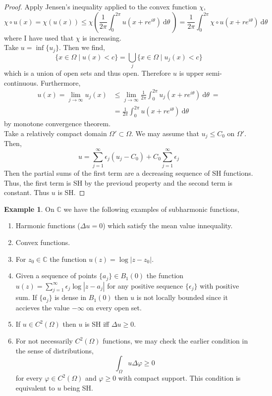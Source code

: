 \documentclass[12pt]{extarticle}
\newcommand{\C}{\mathbb{C}}
\renewcommand{\d}[1]{\: \mathrm{d}#1 \:}
\theoremstyle{definition}
\newtheorem{example}[theorem]{Example}
\begin{document}
\begin{proof}
Apply Jensen's inequality applied to the convex function $\chi$,
\[ \chi \circ u(x) = \chi(u(x)) \le \chi \left( \frac{1}{2 \pi} \int_0^{2 \pi} u(x + r e^{i \theta}) \d{\theta} \right) = \frac{1}{2\pi} \int_0^{2 \pi} \chi \circ u(x + r e^{i \theta}) \d{\theta} \] 
where I have used that $\chi$ is increasing.
\bigskip\\
Take $u = \inf \{ u_j \}$. Then we find,
\[ \{ x \in \Omega \mid u(x) < c \} = \bigcup_j \{ x \in \Omega \mid u_j(x) < c \} \]
which is a union of open sets and thus open. Therefore $u$ is upper semi-continuous. Furthermore,
\begin{align*}
u(x) = \lim_{j \to \infty} u_j(x) & \le \lim_{j \to \infty} \frac{1}{2 \pi} \int_0^{2 \pi} u_j(x + r e^{i \theta}) \d{\theta} = 
\\
& = \frac{1}{2 \pi} \int_0^{2 \pi} u(x + r e^{i \theta}) \d{\theta} 
\end{align*}
by monotone convergence theorem. 
\bigskip\\
Take a relatively compact domain $\Omega' \subset \Omega$. We may assume that $u_j \le C_0$ on $\Omega'$. Then,
\[ u = \sum_{j = 1}^\infty \epsilon_j (u_j - C_0) + C_0 \sum_{j = 1}^\infty \epsilon_j \]
Then the partial sums of the first term are a decreasing sequence of SH functions. Thus, the first term is SH by the previoud property and the second term is constant. Thus $u$ is SH. 
\end{proof}

\begin{example}
On $\C$ we have the following examples of subharmonic functions,
\begin{enumerate}
\item Harmonic functions ($\Delta u = 0$) which satisfy the mean value innequality.
\item Convex functions.
\item For $z_0 \in \C$ the function $u(z) = \log{|z - z_0|}$.
\item Given a sequence of points $\{ a_j \} \in B_1(0)$ the function $u(z) = \sum_{j = 1}^\infty \epsilon_j \log{|z - a_j|}$ for any positive sequence $\{ \epsilon_j \}$ with positive sum. If $\{ a_j \}$ is dense in $B_1(0)$ then $u$ is not locally bounded since it accieves the value $-\infty$ on every open set. 
\item If $u \in C^2(\Omega)$ then $u$ is SH iff $\Delta u \ge 0$.
\item For not necessarily $C^2(\Omega)$ functions, we may check the earlier condition in the sense of distributions,
\[ \int_\Omega u \Delta \varphi \ge 0 \]
for every $\varphi \in C^2(\Omega)$ and $\varphi \ge 0$ with compact support. This condition is equivalent to $u$ being SH.
\end{enumerate}
\end{example}
\end{document}
